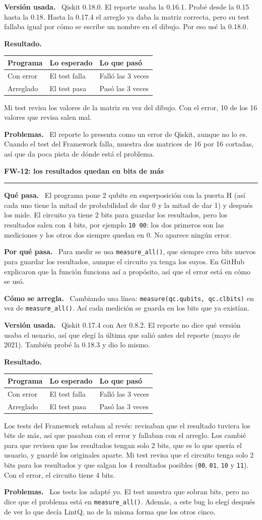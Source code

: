 \documentclass[11pt,a4paper]{article}
\newcommand{\paper}[1]{\vspace{1.2em}\par{\large\textbf{#1}}\par\vspace{0.2em}\hrule\vspace{0.4em}}
\newcommand{\parte}[1]{\par\textbf{#1.}\ }
\newcommand{\resultados}[1]{%
\begin{center}
\begin{tabular}{lll}
\toprule
Programa & Lo esperado & Lo que pasó \\
\midrule
Con error & El test falla & Falló las 3 veces \\
Arreglado & El test pasa & Pasó las 3 veces \\
\bottomrule
\end{tabular}
\end{center}}
\begin{document}
\parte{Versión usada}
Qiskit 0.18.0. El reporte usaba la 0.16.1. Probé desde la 0.15 hasta la 0.18. Hasta la 0.17.4 el arreglo ya daba la matriz correcta, pero su test fallaba igual por cómo se escribe un nombre en el dibujo. Por eso usé la 0.18.0.

\parte{Resultado}
\resultados{8}
Mi test revisa los valores de la matriz en vez del dibujo. Con el error, 10 de los 16 valores que revisa salen mal.

\parte{Problemas}
El reporte lo presenta como un error de Qiskit, aunque no lo es. Cuando el test del Framework falla, muestra dos matrices de 16 por 16 cortadas, así que da poca pista de dónde está el problema.

\paper{FW-12: los resultados quedan en bits de más}

\parte{Qué pasa}
El programa pone 2 qubits en superposición con la puerta H (así cada uno tiene la mitad de probabilidad de dar 0 y la mitad de dar 1) y después los mide. El circuito ya tiene 2 bits para guardar los resultados, pero los resultados salen con 4 bits, por ejemplo \texttt{10 00}: los dos primeros son las mediciones y los otros dos siempre quedan en 0. No aparece ningún error.

\parte{Por qué pasa}
Para medir se usa \texttt{measure\_all()}, que siempre crea bits nuevos para guardar los resultados, aunque el circuito ya tenga los suyos. En GitHub explicaron que la función funciona así a propósito, así que el error está en cómo se usó.

\parte{Cómo se arregla}
Cambiando una línea: \texttt{measure(qc.qubits, qc.clbits)} en vez de \texttt{measure\_all()}. Así cada medición se guarda en los bits que ya existían.

\parte{Versión usada}
Qiskit 0.17.4 con Aer 0.8.2. El reporte no dice qué versión usaba el usuario, así que elegí la última que salió antes del reporte (mayo de 2021). También probé la 0.18.3 y dio lo mismo.

\parte{Resultado}
\resultados{12}
Los tests del Framework estaban al revés: revisaban que el resultado tuviera los bits de más, así que pasaban con el error y fallaban con el arreglo. Los cambié para que revisen que los resultados tengan solo 2 bits, que es lo que quería el usuario, y guardé los originales aparte. Mi test revisa que el circuito tenga solo 2 bits para los resultados y que salgan los 4 resultados posibles (\texttt{00}, \texttt{01}, \texttt{10} y \texttt{11}). Con el error, el circuito tiene 4 bits.

\parte{Problemas}
Los tests los adapté yo. El test muestra que sobran bits, pero no dice que el problema está en \texttt{measure\_all()}. Además, a este bug lo elegí después de ver lo que decía LintQ, no de la misma forma que los otros cinco.
\end{document}
